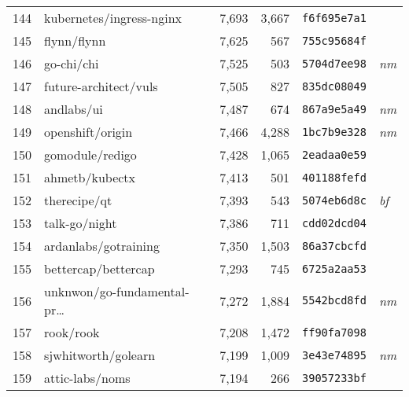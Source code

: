 {\begin{supertabular}{llrrll}
        144 &           kubernetes/ingress-nginx &  7,693 &  3,667 &  \texttt{f6f695e7a1} &              \\
        145 &                        flynn/flynn &  7,625 &    567 &  \texttt{755c95684f} &              \\
        146 &                         go-chi/chi &  7,525 &    503 &  \texttt{5704d7ee98} &  \textit{nm} \\
        147 &              future-architect/vuls &  7,505 &    827 &  \texttt{835dc08049} &              \\
        148 &                         andlabs/ui &  7,487 &    674 &  \texttt{867a9e5a49} &  \textit{nm} \\
        149 &                   openshift/origin &  7,466 &  4,288 &  \texttt{1bc7b9e328} &  \textit{nm} \\
        150 &                    gomodule/redigo &  7,428 &  1,065 &  \texttt{2eadaa0e59} &              \\
        151 &                     ahmetb/kubectx &  7,413 &    501 &  \texttt{401188fefd} &              \\
        152 &                       therecipe/qt &  7,393 &    543 &  \texttt{5074eb6d8c} &  \textit{bf} \\
        153 &                      talk-go/night &  7,386 &    711 &  \texttt{cdd02dcd04} &              \\
        154 &               ardanlabs/gotraining &  7,350 &  1,503 &  \texttt{86a37cbcfd} &              \\
        155 &                bettercap/bettercap &  7,293 &    745 &  \texttt{6725a2aa53} &              \\
        156 &    unknwon/go-fundamental-pr\ldots &  7,272 &  1,884 &  \texttt{5542bcd8fd} &  \textit{nm} \\
        157 &                          rook/rook &  7,208 &  1,472 &  \texttt{ff90fa7098} &              \\
        158 &                sjwhitworth/golearn &  7,199 &  1,009 &  \texttt{3e43e74895} &  \textit{nm} \\
        159 &                    attic-labs/noms &  7,194 &    266 &  \texttt{39057233bf} &              \\

\end{supertabular}}
